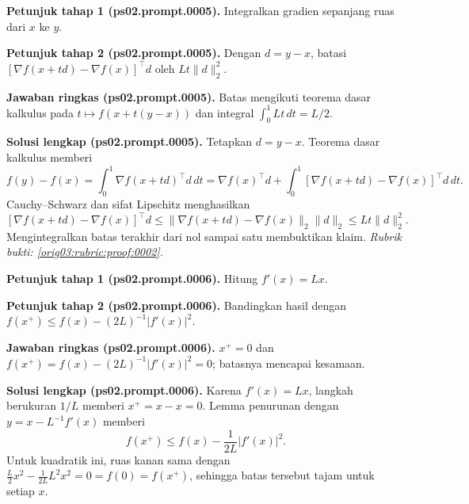 \par\noindent\textbf{Petunjuk tahap 1 (ps02.prompt.0005).}
Integralkan gradien sepanjang ruas dari $x$ ke $y$.
\label{orig03:ps02:hint1:0005}
\par\noindent\textbf{Petunjuk tahap 2 (ps02.prompt.0005).}
Dengan $d=y-x$, batasi
$[\nabla f(x+td)-\nabla f(x)]^\top d$ oleh $Lt\lVert d\rVert_2^2$.
\label{orig03:ps02:hint2:0005}
\par\noindent\textbf{Jawaban ringkas (ps02.prompt.0005).}
Batas mengikuti teorema dasar kalkulus pada $t\mapsto f(x+t(y-x))$ dan
integral $\int_0^1Lt\,dt=L/2$.
\label{orig03:ps02:answer:0005}
\par\noindent\textbf{Solusi lengkap (ps02.prompt.0005).}
Tetapkan $d=y-x$. Teorema dasar kalkulus memberi
\[
 f(y)-f(x)=\int_0^1\nabla f(x+td)^\top d\,dt
 =\nabla f(x)^\top d+
 \int_0^1[\nabla f(x+td)-\nabla f(x)]^\top d\,dt.
\]
Cauchy--Schwarz dan sifat Lipschitz menghasilkan
\[
 [\nabla f(x+td)-\nabla f(x)]^\top d
 \leq \lVert\nabla f(x+td)-\nabla f(x)\rVert_2\lVert d\rVert_2
 \leq Lt\lVert d\rVert_2^2.
\]
Mengintegralkan batas terakhir dari nol sampai satu membuktikan klaim.
\emph{Rubrik bukti: \ref{orig03:rubric:proof:0002}.}
\label{orig03:ps02:solution:0005}

\par\noindent\textbf{Petunjuk tahap 1 (ps02.prompt.0006).}
Hitung $f'(x)=Lx$.
\label{orig03:ps02:hint1:0006}
\par\noindent\textbf{Petunjuk tahap 2 (ps02.prompt.0006).}
Bandingkan hasil dengan
$f(x^+)\leq f(x)-(2L)^{-1}|f'(x)|^2$.
\label{orig03:ps02:hint2:0006}
\par\noindent\textbf{Jawaban ringkas (ps02.prompt.0006).}
$x^+=0$ dan
$f(x^+)=f(x)-(2L)^{-1}|f'(x)|^2=0$; batasnya mencapai kesamaan.
\label{orig03:ps02:answer:0006}
\par\noindent\textbf{Solusi lengkap (ps02.prompt.0006).}
Karena $f'(x)=Lx$, langkah berukuran $1/L$ memberi $x^+=x-x=0$.
Lemma penurunan dengan $y=x-L^{-1}f'(x)$ memberi
\[
 f(x^+)\leq f(x)-\frac1{2L}|f'(x)|^2.
\]
Untuk kuadratik ini, ruas kanan sama dengan
$\tfrac L2x^2-\tfrac1{2L}L^2x^2=0=f(0)=f(x^+)$, sehingga batas tersebut
tajam untuk setiap $x$.
\label{orig03:ps02:solution:0006}

